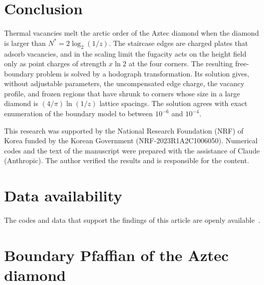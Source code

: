 \documentclass[reprint,aps,pre,superscriptaddress,longbibliography,floatfix,amsmath,amssymb]{revtex4-2}
\newcommand{\Nst}{N^{*}}                 %
\begin{document}
\section{Conclusion}\label{sec:conclusion}

Thermal vacancies melt the arctic order of the Aztec diamond when the diamond is larger than $\Nst=2\log_2(1/z)$. The staircase edges are charged plates that adsorb vacancies, and in the scaling limit the fugacity acts on the height field only as point charges of strength $x\ln2$ at the four corners. The resulting free-boundary problem is solved by a hodograph transformation. Its solution gives, without adjustable parameters, the uncompensated edge charge, the vacancy profile, and frozen regions that have shrunk to corners whose size in a large diamond is $(4/\pi)\ln(1/z)$ lattice spacings. The solution agrees with exact enumeration of the boundary model to between $10^{-6}$ and $10^{-4}$.

\begin{acknowledgments}
This research was supported by the National Research Foundation (NRF) of Korea funded by the Korean Government (NRF-2023R1A2C1006050). Numerical codes and the text of the manuscript were prepared with the assistance of Claude (Anthropic). The author verified the results and is responsible for the content.
\end{acknowledgments}

\section*{Data availability}
The codes and data that support the findings of this article are openly available~\cite{repo}.

\appendix

\section{Boundary Pfaffian of the Aztec diamond}\label{app:pfaffian}
\end{document}
